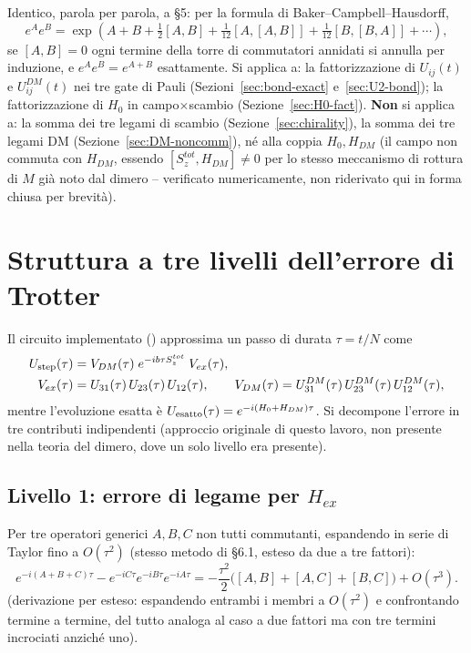 \documentclass[11pt,a4paper]{article}
\begin{document}
Identico, parola per parola, a \texttt{} \S5: per la formula di Baker--Campbell--Hausdorff,
\begin{equation}
e^{A}e^{B} = \exp\!\left(A+B+\tfrac12[A,B]+\tfrac1{12}[A,[A,B]]+\tfrac1{12}[B,[B,A]]+\cdots\right),
\end{equation}
se $[A,B]=0$ ogni termine della torre di commutatori annidati si annulla per induzione, e $e^Ae^B=e^{A+B}$ esattamente. Si applica a: la fattorizzazione di $U_{ij}(t)$ e $U_{ij}^{DM}(t)$ nei tre gate di Pauli (Sezioni~\ref{sec:bond-exact} e~\ref{sec:U2-bond}); la fattorizzazione di $H_0$ in campo$\times$scambio (Sezione~\ref{sec:H0-fact}). \textbf{Non} si applica a: la somma dei tre legami di scambio (Sezione~\ref{sec:chirality}), la somma dei tre legami DM (Sezione~\ref{sec:DM-noncomm}), né alla coppia $H_0,H_{DM}$ (il campo non commuta con $H_{DM}$, essendo $[S_z^{tot},H_{DM}]\neq0$ per lo stesso meccanismo di rottura di $M$ già noto dal dimero -- verificato numericamente, non riderivato qui in forma chiusa per brevità).

\section{Struttura a tre livelli dell'errore di Trotter}
\label{sec:trotter-error}

Il circuito implementato (\texttt{}) approssima un passo di durata $\tau=t/N$ come
\begin{align}
U_{\rm step}(\tau) &= V_{DM}(\tau)\;e^{-ib\tau S_z^{tot}}\;V_{ex}(\tau), \label{eq:Ustep-def}\\
V_{ex}(\tau)&=U_{31}(\tau)\,U_{23}(\tau)\,U_{12}(\tau), \qquad V_{DM}(\tau)=U_{31}^{DM}(\tau)\,U_{23}^{DM}(\tau)\,U_{12}^{DM}(\tau),
\end{align}
mentre l'evoluzione esatta è $U_{\rm esatto}(\tau)=e^{-i(H_0+H_{DM})\tau}$. Si decompone l'errore in tre contributi indipendenti (approccio originale di questo lavoro, non presente nella teoria del dimero, dove un solo livello era presente).

\subsection{Livello 1: errore di legame per $H_{ex}$}
\label{sec:trotter-error-Hex}

Per tre operatori generici $A,B,C$ non tutti commutanti, espandendo in serie di Taylor fino a $O(\tau^2)$ (stesso metodo di \texttt{} \S6.1, esteso da due a tre fattori):
\begin{equation}
e^{-i(A+B+C)\tau} - e^{-iC\tau}e^{-iB\tau}e^{-iA\tau} = -\frac{\tau^2}{2}\Big([A,B]+[A,C]+[B,C]\Big) + O(\tau^3).
\label{eq:3term-BCH-error}
\end{equation}
(derivazione per esteso: espandendo entrambi i membri a $O(\tau^2)$ e confrontando termine a termine, del tutto analoga al caso a due fattori ma con tre termini incrociati anziché uno).
\end{document}
